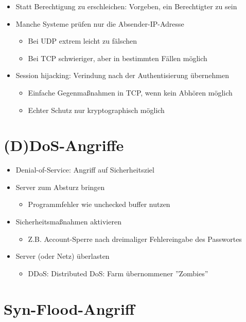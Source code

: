 \documentclass[openany]{book}
\begin{document}
\begin{itemize}
    \item Statt Berechtigung zu erschleichen: Vorgeben, ein Berechtigter zu sein
    \item Manche Systeme prüfen nur die Absender-IP-Adresse
    \begin{itemize}
        \item Bei UDP extrem leicht zu fälschen
        \item Bei TCP schwieriger, aber in bestimmten Fällen möglich
    \end{itemize}
    \item Session hijacking: Verindung nach der Authentisierung übernehmen
    \begin{itemize}
        \item Einfache Gegenmaßnahmen in TCP, wenn kein Abhören möglich
        \item Echter Schutz nur kryptographisch möglich
    \end{itemize}
\end{itemize}

\section{(D)DoS-Angriffe}

\begin{itemize}
    \item Denial-of-Service: Angriff auf Sicherheitsziel
    \item Server zum Absturz bringen
    \begin{itemize}
        \item Programmfehler wie unchecked buffer nutzen
    \end{itemize}
    \item Sicherheitsmaßnahmen aktivieren
    \begin{itemize}
        \item Z.B. Account-Sperre nach dreimaliger Fehlereingabe des Passwortes
    \end{itemize}
    \item Server (oder Netz) überlasten
    \begin{itemize}
        \item DDoS: Distributed DoS: Farm übernommener ''Zombies''
    \end{itemize}
\end{itemize}

\section{Syn-Flood-Angriff}
\end{document}
